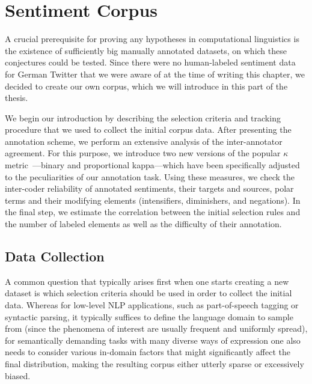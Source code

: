 

\chapter{Sentiment Corpus}\label{chap:corpus}

A crucial prerequisite for proving any hypotheses in computational
linguistics is the existence of sufficiently big manually annotated
datasets, on which these conjectures could be tested.  Since there
were no human-labeled sentiment data for German Twitter that we were
aware of at the time of writing this chapter, we decided to create our
own corpus, which we will introduce in this part of the thesis.

We begin our introduction by describing the selection criteria and
tracking procedure that we used to collect the initial corpus data.
After presenting the annotation scheme, we perform an extensive
analysis of the inter-annotator agreement.  For this purpose, we
introduce two new versions of the popular $\kappa$
metric~\cite{Cohen:60}---binary and proportional kappa---which have
been specifically adjusted to the peculiarities of our annotation
task.  Using these measures, we check the inter-coder reliability of
annotated sentiments, their targets and sources, polar terms and their
modifying elements (intensifiers, diminishers, and negations).  In the
final step, we estimate the correlation between the initial selection
rules and the number of labeled elements as well as the difficulty of
their annotation.

\section{Data Collection}

A common question that typically arises first when one starts creating
a new dataset is which selection criteria should be used in order to
collect the initial data.  Whereas for low-level NLP applications,
such as part-of-speech tagging or syntactic parsing, it typically
suffices to define the language domain to sample from (since the
phenomena of interest are usually frequent and uniformly spread), for
semantically demanding tasks with many diverse ways of expression one
also needs to consider various in-domain factors that might
significantly affect the final distribution, making the resulting
corpus either utterly sparse or excessively biased.

